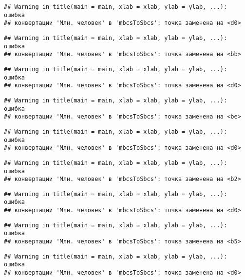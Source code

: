 \documentclass[
]{article}
\begin{document}
\begin{verbatim}
## Warning in title(main = main, xlab = xlab, ylab = ylab, ...): ошибка
## конвертации 'Млн. человек' в 'mbcsToSbcs': точка заменена на <d0>
\end{verbatim}

\begin{verbatim}
## Warning in title(main = main, xlab = xlab, ylab = ylab, ...): ошибка
## конвертации 'Млн. человек' в 'mbcsToSbcs': точка заменена на <bb>
\end{verbatim}

\begin{verbatim}
## Warning in title(main = main, xlab = xlab, ylab = ylab, ...): ошибка
## конвертации 'Млн. человек' в 'mbcsToSbcs': точка заменена на <d0>
\end{verbatim}

\begin{verbatim}
## Warning in title(main = main, xlab = xlab, ylab = ylab, ...): ошибка
## конвертации 'Млн. человек' в 'mbcsToSbcs': точка заменена на <be>
\end{verbatim}

\begin{verbatim}
## Warning in title(main = main, xlab = xlab, ylab = ylab, ...): ошибка
## конвертации 'Млн. человек' в 'mbcsToSbcs': точка заменена на <d0>
\end{verbatim}

\begin{verbatim}
## Warning in title(main = main, xlab = xlab, ylab = ylab, ...): ошибка
## конвертации 'Млн. человек' в 'mbcsToSbcs': точка заменена на <b2>
\end{verbatim}

\begin{verbatim}
## Warning in title(main = main, xlab = xlab, ylab = ylab, ...): ошибка
## конвертации 'Млн. человек' в 'mbcsToSbcs': точка заменена на <d0>
\end{verbatim}

\begin{verbatim}
## Warning in title(main = main, xlab = xlab, ylab = ylab, ...): ошибка
## конвертации 'Млн. человек' в 'mbcsToSbcs': точка заменена на <b5>
\end{verbatim}

\begin{verbatim}
## Warning in title(main = main, xlab = xlab, ylab = ylab, ...): ошибка
## конвертации 'Млн. человек' в 'mbcsToSbcs': точка заменена на <d0>
\end{verbatim}
\end{document}
